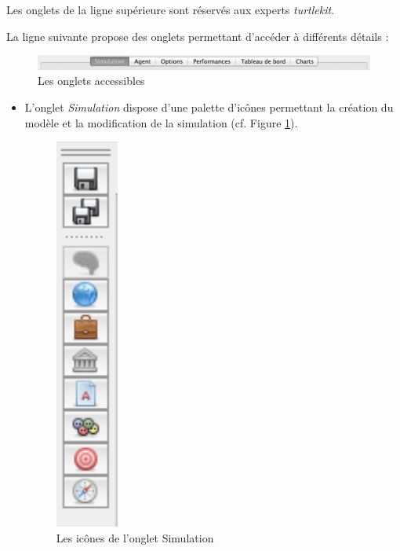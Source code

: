 \documentclass[a4paper,oneside,12 pt]{article}
\begin{document}
Les onglets de la ligne supérieure sont réservés aux experts \textit{turtlekit}.



La ligne suivante propose des onglets permettant d'accéder à différents détails :
\begin{figure}[hbtp]
\begin{center}
 \includegraphics [scale=0.5] {Onglets.pdf}
\end{center}
 \caption{Les onglets accessibles }
\end{figure}


\begin{itemize}
\item L'onglet\textit{ Simulation} dispose d'une palette d'icônes permettant la création du modèle et  la modification de la simulation (cf. Figure \ref{IC}).

\begin{figure}[hbtp]
\begin{center}
 \includegraphics [scale=0.6] {icone.pdf}
\end{center}
 \caption{Les icônes de l'onglet Simulation }
 \label{IC}
\end{figure}



\end{itemize}
\end{document}
